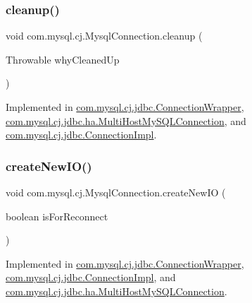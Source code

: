 \subsubsection{\texorpdfstring{cleanup()}{cleanup()}}
{\footnotesize\ttfamily void com.\+mysql.\+cj.\+Mysql\+Connection.\+cleanup (\begin{DoxyParamCaption}\item[{Throwable}]{why\+Cleaned\+Up }\end{DoxyParamCaption})}



Implemented in \mbox{\hyperlink{classcom_1_1mysql_1_1cj_1_1jdbc_1_1_connection_wrapper_ab604be7f74e54251056bc902359fa65a}{com.\+mysql.\+cj.\+jdbc.\+Connection\+Wrapper}}, \mbox{\hyperlink{classcom_1_1mysql_1_1cj_1_1jdbc_1_1ha_1_1_multi_host_my_s_q_l_connection_a60353fa7a398c8186c22a0ceba331655}{com.\+mysql.\+cj.\+jdbc.\+ha.\+Multi\+Host\+My\+S\+Q\+L\+Connection}}, and \mbox{\hyperlink{classcom_1_1mysql_1_1cj_1_1jdbc_1_1_connection_impl_ac72cb58dc4f2b002b1882b69815cc64b}{com.\+mysql.\+cj.\+jdbc.\+Connection\+Impl}}.

\mbox{\label{interfacecom_1_1mysql_1_1cj_1_1_mysql_connection_a95370bad49129eb6c1f5136e008e6ed1}} 
\subsubsection{\texorpdfstring{create\+New\+I\+O()}{createNewIO()}}
{\footnotesize\ttfamily void com.\+mysql.\+cj.\+Mysql\+Connection.\+create\+New\+IO (\begin{DoxyParamCaption}\item[{boolean}]{is\+For\+Reconnect }\end{DoxyParamCaption})}



Implemented in \mbox{\hyperlink{classcom_1_1mysql_1_1cj_1_1jdbc_1_1_connection_wrapper_addd175e6d6524fb4a1f626f17f732670}{com.\+mysql.\+cj.\+jdbc.\+Connection\+Wrapper}}, \mbox{\hyperlink{classcom_1_1mysql_1_1cj_1_1jdbc_1_1_connection_impl_a063addf80134be647765cd125d270968}{com.\+mysql.\+cj.\+jdbc.\+Connection\+Impl}}, and \mbox{\hyperlink{classcom_1_1mysql_1_1cj_1_1jdbc_1_1ha_1_1_multi_host_my_s_q_l_connection_a82a97ebf4275bab6b1a25ef00985185d}{com.\+mysql.\+cj.\+jdbc.\+ha.\+Multi\+Host\+My\+S\+Q\+L\+Connection}}.

